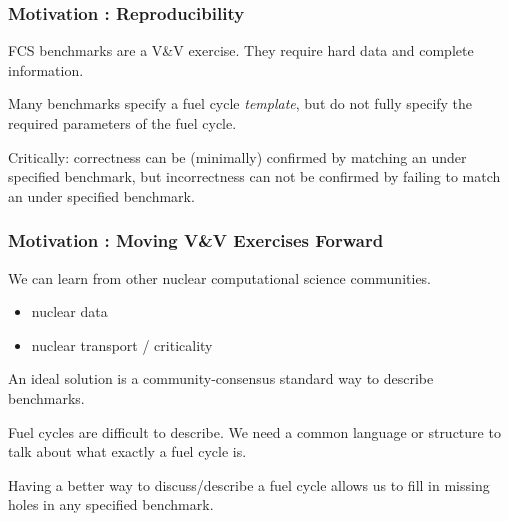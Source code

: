 \begin{frame}[ctb!]
  \frametitle{Motivation : Reproducibility}
  FCS benchmarks are a V\&V exercise. They require hard data and complete 
  information.

  \vspace{0.4cm}

  Many benchmarks specify a fuel cycle \textit{template}, but do not fully 
  specify the required parameters of the fuel cycle.

  \vspace{0.4cm}

  Critically: correctness can be (minimally) confirmed by matching an under
  specified benchmark, but incorrectness can not be confirmed by failing to
  match an under specified benchmark.
\end{frame}

\begin{frame}[ctb!]
  \frametitle{Motivation : Moving V\&V Exercises Forward}
  We can learn from other nuclear computational science communities.
  \begin{itemize}
    \item nuclear data \cite{mattoon_generalized_2012}
    \item nuclear transport / criticality
  \end{itemize}

  An ideal solution is a community-consensus standard way to describe benchmarks.

  \vspace{0.4cm}

  Fuel cycles are difficult to describe. We need a common language or structure
  to talk about what exactly a fuel cycle is.

  \vspace{0.4cm}

  Having a better way to discuss/describe a fuel cycle allows us to fill in
  missing holes in any specified benchmark.
\end{frame}

